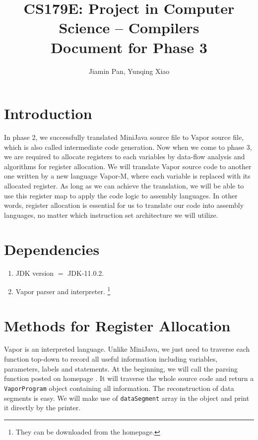 \documentclass[letterpaper, 14pt]{article}
\begin{document}
\title{CS179E: Project in Computer Science -- Compilers\\ Document for Phase 3}
\author{Jiamin Pan, Yunqing Xiao}
\date{}
\maketitle

\section{Introduction}

In phase 2, we successfully translated MiniJava source file to Vapor source file, which is also called intermediate code generation. Now when we come to phase 3, we are required to allocate registers to each variables by data-flow analysis and algorithms for register allocation. We will translate Vapor source code to another one written by a new language Vapor-M, where each variable is replaced with its allocated register. As long as we can achieve the translation, we will be able to use this register map to apply the code logic to assembly languages. In other words, register allocation is essential for us to translate our code into assembly languages, no matter which instruction set architecture we will utilize. 

\section{Dependencies}

\begin{enumerate}
\item JDK version $=$ JDK-11.0.2. 
\item Vapor parser and interpreter. \footnote{They can be downloaded from the homepage. }
\end{enumerate}

\section{Methods for Register Allocation}

Vapor is an interpreted language. Unlike MiniJava, we just need to traverse each function top-down to record all useful information including variables, parameters, labels and statements. At the beginning, we will call the parsing function posted on homepage \cite{homepage}. It will traverse the whole source code and return a \texttt{VaporProgram} object containing all information. The reconstruction of data segments is easy. We will make use of \texttt{dataSegment} array in the object and print it directly by the printer. 
\end{document}
